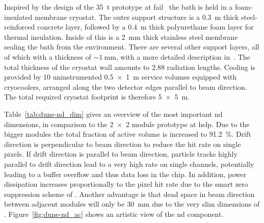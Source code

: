Inspired by the design of the \dune{} \SI{35}{\tonne} prototype at \gls{fail}~\cite{dune4} the \lar{} bath is held in a foam-insulated membrane cryostat.
The outer support structure is a \SI{0.3}{\metre} thick steel-reinforced concrete layer, followed by a \SI{0.4}{\metre} thick polyurethane foam layer for thermal insulation.
Inside of this is a \SI{2}{\milli\metre} thick stainless steel membrane sealing the \lar{} bath from the environment.
There are several other support layers, all of which with a thickness of $\sim{\SI{1}{\milli\metre}}$, with a more detailed description in~\cite{dune4}.
The total thickness of the cryostat wall amounts to \num{2.88} radiation lengths.
Cooling is provided by \num{10} uninstrumented \SI{0.5 x 1}{\metre} service volumes equipped with cryocoolers, arranged along the two detector edges parallel to beam direction.
The total required cryostat footprint is therefore \SI{5 x 5}{\metre}.

Table~\ref{tab:dune-nd_dim} gives an overview of the most important \AC{} \gls{nd} dimensions, in comparison to the \num{2 x 2} module prototype at \gls{help}.
Due to the bigger modules the total fraction of active volume is increased to \SI{91.2}{\percent}.
Drift direction is perpendicular to beam direction to reduce the hit rate on single pixels.
If drift direction is parallel to beam direction, particle tracks highly parallel to drift direction lead to a very high rate on single channels, potentially leading to a buffer overflow and thus data loss in the \larpix{} chip.
In addition, power dissipation increases proportionally to the pixel hit rate due to the smart zero suppression scheme of \larpix{}.
Another advantage is that dead space in beam direction between adjacent modules will only be \SI{30}{\milli\metre} due to the very slim dimensions of \AL{}.
Figure~\ref{fig:dune-nd_ac} shows an artistic view of the \AC{} \gls{nd} component.